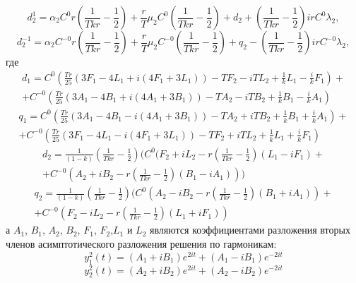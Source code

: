 \documentclass[12pt]{article}
\begin{document}
\begin{equation*}
    d^1_2=\alpha_2 C^0 r \left ( \frac{1}{T k r}-\frac{1}{2} \right)+\frac{r}{T} \mu_2 C^0 \left ( \frac{1}{T k r}-\frac{1}{2} \right)+d_2 +\left ( \frac{1}{T k r}-\frac{1}{2} \right)i r C^0 \lambda_2,
\end{equation*}
\begin{equation*}
    d^{-1}_2=\alpha_2 C^{-0} r \left ( \frac{1}{T k r}-\frac{1}{2} \right)+\frac{r}{T} \mu_2 C^{-0} \left ( \frac{1}{T k r}-\frac{1}{2} \right)+q_2 -\left ( \frac{1}{T k r}-\frac{1}{2} \right)i r C^{-0} \lambda_2,
\end{equation*}
где 
\begin{multline*}
     d_1= C^0 (\frac{T r}{25} (3 F_1 -4 L_1 + i (4 F_1 +3 L_1))- T F_2 -i T L_2 + \frac{1}{k} L_1 - \frac{i}{k} F_1)+\\+C^{-0} (\frac{T r}{25} (3 A_1 -4 B_1 + i (4 A_1 +3 B_1))- T A_2 -i T B_2 + \frac{1}{k} B_1 - \frac{i}{k} A_1)
\end{multline*}
\begin{multline*}
     q_1= C^0 (\frac{T r}{25} (3 A_1 -4 B_1 - i (4 A_1 +3 B_1))- T A_2 +i T B_2 + \frac{1}{k} B_1 + \frac{i}{k} A_1)+\\+C^{-0} (\frac{T r}{25} (3 F_1 -4 L_1 - i (4 F_1 +3 L_1))- T F_2 +i T L_2 + \frac{1}{k} L_1 + \frac{i}{k} F_1)
\end{multline*}
\begin{multline*}
    d_2=\frac{1}{ (1-k)}\left( \frac{1}{T k r} - \frac{1}{2} \right) ( C^0 (F_2+i L_2 -r \left( \frac{1}{T k r} - \frac{1}{2} \right)(L_1-i F_1)+\\ + C^{-0}(A_2+i B_2 -r \left( \frac{1}{T k r} - \frac{1}{2} \right)(B_1-i A_1)))
\end{multline*}
\begin{multline*}
    q_2=\frac{1}{ (1-k)}\left( \frac{1}{T k r} - \frac{1}{2} \right) ( C^0 (A_2-i B_2 -r \left( \frac{1}{T k r} - \frac{1}{2} \right)(B_1+i A_1))+\\ + C^{-0}(F_2-i L_2 -r \left( \frac{1}{T k r} - \frac{1}{2} \right)(L_1+i F_1))
\end{multline*}
а $A_1$, $B_1$, $A_2$, $B_2$, $F_1$, $F_2$,$L_1$ и $L_2$ являются коэффициентами разложения вторых членов асимптотического разложения решения по гармоникам:
\begin{equation*}
    y_1^2(t)=(A_1+i B_1)e^{2 i t} + (A_1 -i B_1)e^{-2 i t}
\end{equation*}
\begin{equation*}
    y_2^2(t)=(A_2+i B_2)e^{2 i t} + (A_2 -i B_2)e^{-2 i t}
\end{equation*}
\end{document}
